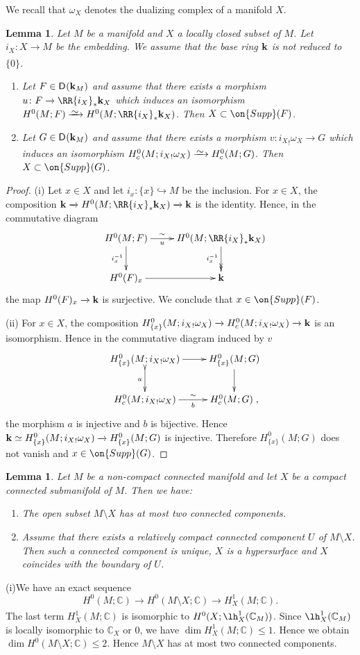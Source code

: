 \documentclass[12pt,leqno]{article}
\newtheorem{lemma}[theorem]{Lemma}
\theoremstyle{definition}
\newcommand{\C}{{\mathbb{C}}}
\newcommand{\cor}{{\bf k}}
\renewcommand{\to}[1][]{\xrightarrow[]{#1}}
\newcommand{\isoto}[1][]{\xrightarrow[#1]%
{{\raisebox{-.6ex}[0ex][-.6ex]{$\mspace{1mu}\sim\mspace{2mu}$}}}}
\newcommand{\eim}[1]{{#1}_!}
\newcommand{\roim}[1]{\RR{#1}_*}
\newcommand{\cl}{\colon}
\newcommand{\bnum}{\begin{enumerate}[{\rm(i)}]}
\newcommand{\enum}{\end{enumerate}}
\newcommand{\eqn}{\begin{eqnarray*}}
\newcommand{\eneqn}{\end{eqnarray*}}
\newcommand{\Supp}{\on{Supp}}
\newcommand{\Der}[1][]{\mathsf{D}^{#1}}
\numberwithin{equation}{section}
\begin{document}
We recall that $\omega_X$ denotes the dualizing complex of a manifold
$X$.
\begin{lemma}\label{le:positiso}
Let $M$ be a manifold and $X$ a locally closed subset of $M$.
Let $i_X\cl X\to M$ be the embedding.
We assume that the base ring $\cor$ is not reduced to $\{0\}$.
\bnum
\item
Let $F\in\Der(\cor_M)$ and assume that there exists a morphism
$u\cl F\to\roim{i_X}\cor_X$ which induces an isomorphism
$H^0(M;F)\isoto H^0(M;\roim{i_X}\cor_X)$. Then $X\subset\Supp(F)$.
\item
Let $G\in\Der(\cor_M)$ and  assume that there exists a morphism 
$v\cl \eim{i_X}\omega_X\to G$ which induces an isomorphism
$H^0_c(M;\eim{i_X}\omega_X)\isoto H^0_c(M;G)$. 
Then $X\subset\Supp(G)$.
\enum
\end{lemma}
\begin{proof}
(i) Let $x\in X$ and let $i_x\cl\{x\}\hookrightarrow M$
be the inclusion. For $x\in X$, the composition $\cor\to H^0(M;\roim{i_X}\cor_X)\to \cor$
is the identity. Hence, in the commutative diagram
\eqn
&&\xymatrix{
H^0(M;F)\ar[r]^-{\sim}_-{u}\ar[d]_{i_x^{-1}}
                  &H^0(M;\roim{i_X}\cor_X)\ar@{->>}[d]_{i_x^{-1}}\\
H^0(F)_x\ar[r]    &{\cor}
}\eneqn
the map $H^0(F)_x\to \cor$ is surjective. We conclude that 
$x\in\Supp(F)$.


\medskip\noindent
(ii) For $x\in X$, the composition 
$H^0_{\{x\}}(M; \eim{i_X}\omega_X) \to  H^0_c(M; \eim{i_X}\omega_X) \to \cor$
is an isomorphism.
Hence in the commutative diagram induced by $v$
\eqn
&&\xymatrix{
H^0_{\{x\}}(M; \eim{i_X}\omega_X) \ar[r]\ar@{>->}[d]_a& H^0_{\{x\}}(M;G)\ar[d] \\
H^0_c(M; \eim{i_X}\omega_X) \ar[r]_-{b}^-{\sim}& H^0_c(M;G)\;,
}
\eneqn
the morphism $a$ is injective and $b$ is bijective.
Hence $\cor\simeq H^0_{\{x\}}(M; \eim{i_X}\omega_X)\to H^0_{\{x\}}(M;G)$
is injective.
Therefore $H^0_{\{x\}}(M;G)$ does not vanish and 
$x\in\Supp(G)$.
\end{proof}


\begin{lemma}\label{lem:geometry-positiso}
Let $M$ be a non-compact connected manifold and let $X$ be a compact
connected submanifold of $M$. Then we have:
\bnum
\item
The open subset $M\setminus X$ has at most two connected
components. 
\item
Assume that 
there exists a relatively compact connected component $U$
of $M\setminus X$.
Then such a connected component is unique,
$X$ is a hypersurface and $X$ coincides with the boundary of 
$U$.
\enum
\end{lemma}
\Proof
(i)\quad We have an exact sequence 
$$H^0(M;\C)\to H^0(M\setminus X;\C)\to H^1_X(M;\C).$$
The last term $H^1_X(M;\C)$ is isomorphic to $H^0(X;\lh^1_X(\C_M))$.
Since $\lh^1_X(\C_M)$ is locally isomorphic to $\C_X$ or $0$,
we have $\dim H^1_X(M;\C)\le 1$. Hence we obtain
$\dim H^0(M\setminus X;\C)\le 2$.
Hence $M\setminus X$ has at most two connected
components.
\end{document}
